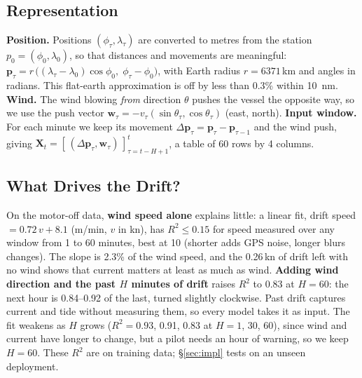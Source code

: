 \documentclass[sigconf]{acmart}
\begin{document}
\subsection{Representation}\label{sec:repr}
\textbf{Position.} Positions $(\phi_\tau,\lambda_\tau)$ are converted to metres from the station $p_0=(\phi_0,\lambda_0)$, so that distances and movements are meaningful: $\mathbf{p}_\tau=r\,\big((\lambda_\tau-\lambda_0)\cos\phi_0,\;\phi_\tau-\phi_0\big)$, with Earth radius $r=6371$\,km and angles in radians. This flat-earth approximation is off by less than 0.3\% within 10~nm.
\textbf{Wind.} The wind blowing \emph{from} direction $\theta$ pushes the vessel the opposite way, so we use the push vector $\mathbf{w}_\tau=-v_\tau(\sin\theta_\tau,\cos\theta_\tau)$ (east, north).
\textbf{Input window.} For each minute we keep its movement $\Delta\mathbf{p}_\tau=\mathbf{p}_\tau-\mathbf{p}_{\tau-1}$ and the wind push, giving
$\mathbf{X}_t=[\,(\Delta\mathbf{p}_\tau,\mathbf{w}_\tau)\,]_{\tau=t-H+1}^{t}$, a table of 60 rows by 4 columns.

\subsection{What Drives the Drift?}\label{sec:explore}
On the motor-off data, \textbf{wind speed alone} explains little: a linear fit, drift speed $=0.72\,v+8.1$ (m/min, $v$ in kn), has $R^2\le0.15$ for speed measured over any window from 1 to 60 minutes, best at 10 (shorter adds GPS noise, longer blurs changes). The slope is 2.3\% of the wind speed, and the 0.26\,kn of drift left with no wind shows that current matters at least as much as wind. \textbf{Adding wind direction and the past $H$ minutes of drift} raises $R^2$ to 0.83 at $H=60$: the next hour is 0.84--0.92 of the last, turned slightly clockwise. Past drift captures current and tide without measuring them, so every model takes it as input. The fit weakens as $H$ grows ($R^2=0.93$, 0.91, 0.83 at $H=1$, 30, 60), since wind and current have longer to change, but a pilot needs an hour of warning, so we keep $H=60$. These $R^2$ are on training data; \S\ref{sec:impl} tests on an unseen deployment.
\end{document}
